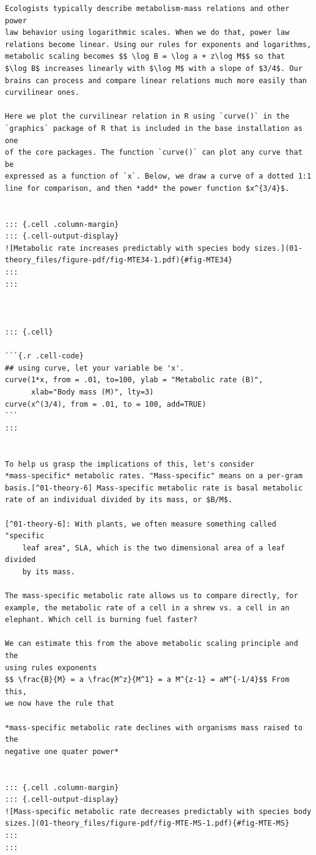 \documentclass[
  10pt,
  letterpaper,
  nols]{tufte-book}
\begin{document}
\begin{verbatim}
Ecologists typically describe metabolism-mass relations and other power
law behavior using logarithmic scales. When we do that, power law
relations become linear. Using our rules for exponents and logarithms,
metabolic scaling becomes $$ \log B = \log a + z\log M$$ so that
$\log B$ increases linearly with $\log M$ with a slope of $3/4$. Our
brains can process and compare linear relations much more easily than
curvilinear ones.

Here we plot the curvilinear relation in R using `curve()` in the
`graphics` package of R that is included in the base installation as one
of the core packages. The function `curve()` can plot any curve that be
expressed as a function of `x`. Below, we draw a curve of a dotted 1:1
line for comparison, and then *add* the power function $x^{3/4}$.


::: {.cell .column-margin}
::: {.cell-output-display}
![Metabolic rate increases predictably with species body sizes.](01-theory_files/figure-pdf/fig-MTE34-1.pdf){#fig-MTE34}
:::
:::



::: {.cell}

```{.r .cell-code}
## using curve, let your variable be 'x'.
curve(1*x, from = .01, to=100, ylab = "Metabolic rate (B)",
      xlab="Body mass (M)", lty=3)
curve(x^(3/4), from = .01, to = 100, add=TRUE)
```
:::


To help us grasp the implications of this, let's consider
*mass-specific* metabolic rates. "Mass-specific" means on a per-gram
basis.[^01-theory-6] Mass-specific metabolic rate is basal metabolic
rate of an individual divided by its mass, or $B/M$.

[^01-theory-6]: With plants, we often measure something called "specific
    leaf area", SLA, which is the two dimensional area of a leaf divided
    by its mass.

The mass-specific metabolic rate allows us to compare directly, for
example, the metabolic rate of a cell in a shrew vs. a cell in an
elephant. Which cell is burning fuel faster?

We can estimate this from the above metabolic scaling principle and the
using rules exponents
$$ \frac{B}{M} = a \frac{M^z}{M^1} = a M^{z-1} = aM^{-1/4}$$ From this,
we now have the rule that

*mass-specific metabolic rate declines with organisms mass raised to the
negative one quater power*


::: {.cell .column-margin}
::: {.cell-output-display}
![Mass-specific metabolic rate decreases predictably with species body sizes.](01-theory_files/figure-pdf/fig-MTE-MS-1.pdf){#fig-MTE-MS}
:::
:::



\end{verbatim}
\end{document}

